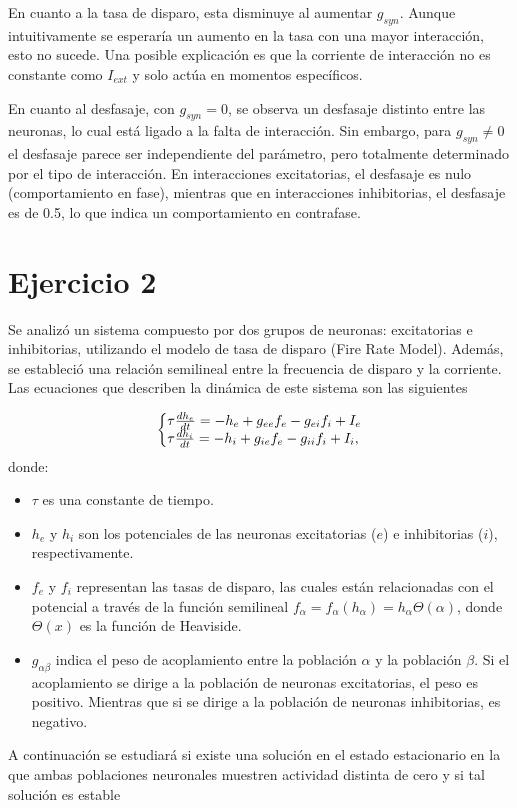 \documentclass[aps,prb,twocolumn,superscriptaddress,floatfix,longbibliography]{revtex4-2}
\newcounter{para}
\begin{document}
En cuanto a la tasa de disparo, esta disminuye al aumentar \(g_{syn}\). Aunque intuitivamente se esperaría un aumento en la tasa con una mayor interacción, esto no sucede. Una posible explicación es que la corriente de interacción no es constante como $I_{ext}$ y solo actúa en momentos específicos.

En cuanto al desfasaje, con $g_{syn} = 0$, se observa un desfasaje distinto entre las neuronas, lo cual está ligado a la falta de interacción. Sin embargo, para $g_{syn} \neq 0$ el desfasaje parece ser independiente del parámetro, pero totalmente determinado por el tipo de interacción. En interacciones excitatorias, el desfasaje es nulo (comportamiento en fase), mientras que en interacciones inhibitorias, el desfasaje es de 0.5, lo que indica un comportamiento en contrafase.

\section{Ejercicio 2}


Se analizó un sistema compuesto por dos grupos de neuronas: excitatorias e inhibitorias, utilizando el modelo de tasa de disparo (Fire Rate Model). Además, se estableció una relación semilineal entre la frecuencia de disparo y la corriente. Las ecuaciones que describen la dinámica de este sistema son las siguientes

\[
\left\{\begin{array}{@{}l@{}}
    \tau \frac{dh_e}{dt} = -h_e + g_{ee} f_e - g_{ei} f_i + I_e \\
    \tau \frac{dh_i}{dt} = -h_i + g_{ie} f_e - g_{ii} f_i + I_i,
    \end{array}\right.
\]
donde:
\begin{itemize}
    \item $\tau$ es una constante de tiempo.
    \item $h_e$ y $h_i$ son los potenciales de las neuronas excitatorias ($e$) e inhibitorias ($i$), respectivamente.
    \item $f_e$ y $f_i$ representan las tasas de disparo, las cuales están relacionadas con el potencial a través de la función semilineal $f_\alpha = f_\alpha(h_\alpha) = h_\alpha\Theta(\alpha)$, donde $\Theta(x)$ es la función de Heaviside.
    \item $g_{\alpha \beta}$ indica el peso de acoplamiento entre la población $\alpha$ y la población $\beta$. Si el acoplamiento se dirige a la población de neuronas excitatorias, el peso es positivo. Mientras que si se dirige a la población de neuronas inhibitorias, es negativo.
\end{itemize}
A continuación se estudiará si existe una solución en el estado estacionario en la que ambas poblaciones neuronales muestren actividad distinta de cero y si tal solución es estable
\end{document}
